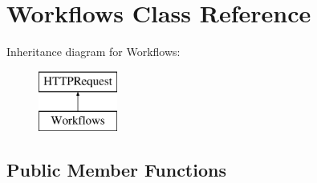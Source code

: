 \hypertarget{classWorkflows}{}\section{Workflows Class Reference}
\label{classWorkflows}
Inheritance diagram for Workflows\+:\begin{figure}[H]
\begin{center}
\leavevmode
\includegraphics[height=2.000000cm]{classWorkflows}
\end{center}
\end{figure}
\subsection*{Public Member Functions}
